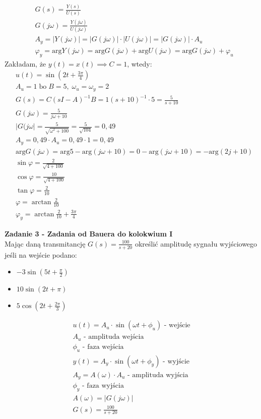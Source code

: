 \documentclass[a4paper,11pt]{article}
\begin{document}
\begin{align*}
&G(s)=\frac{Y(s)}{U(s)} \\
&G(j \omega)=\frac{Y(j\omega)}{U(j\omega)} \\
&A_y=|Y(j\omega)|=|G(j\omega)|\cdot |U(j\omega)|=|G(j\omega)|\cdot A_u \\
&\varphi _{y} = \text{arg} Y(j \omega) = \text{arg} G(j \omega) + \text{arg} U(j \omega )= \text{arg} G(j \omega) + \varphi _u
\end{align*}
Zakładam, że \( y(t) = x(t) \implies C = 1 \), wtedy:
\begin{align*}
&u(t)=\sin (2t+\frac{3\pi}{4} )\\
&A_{u}=1 \; \text{bo} \; B=5, \; \omega _{u} = \omega _y = 2 \\
&G(s)=C(sI-A)^{-1}B=1(s+10)^{-1}\cdot 5=\frac{5}{s+10} \\
&G(j \omega)=\frac{5}{j\omega + 10} \\
&|G(j\omega|=\frac{5}{\sqrt{\omega ^{2}+100}}=\frac{5}{\sqrt{104}}=0,49 \\
&A_y=0,49\cdot A_u = 0,49 \cdot 1 = 0,49\\
&\text{arg} G(j \omega)=\text{arg}5-\text{arg}(j\omega+10)= 0 - \text{arg}(j\omega +10)=-\text{arg}(2j+10) \\
& \sin \varphi = \frac{2}{\sqrt{4+100}} \\
& \cos \varphi = \frac{10}{\sqrt{4+100}} \\
& \tan \varphi = \frac{2}{10} \\
& \varphi = \arctan \frac{2}{10} \\
&\varphi _y = \arctan \frac{2}{10}+\frac{3\pi}{4}
\end{align*}

\newpage
\begin{framed}
\textbf{Zadanie 3 - Zadania od Bauera do kolokwium I } \\ 
Mając daną transmitancję \( G(s) = \frac{100}{s+20} \) określić amplitudę sygnału wyjściowego jeśli na wejście podano:
\begin{itemize}
\item \( -3 \sin (5t+\frac{\pi}{2}) \)
\item \( 10 \sin (2t+\pi) \)
\item \( 5 \cos (2t+\frac{2\pi}{3}) \)
\end{itemize}
\end{framed}
\begin{gather*}
u(t) = A_u \cdot \sin{(\omega t+\phi_u)}\text{ - wejście} \\
A_u \text{ - amplituda wejścia} \\
\phi_u \text{ - faza wejścia} \\
y(t) = A_y \cdot \sin{(\omega t+\phi_y)}\text{ - wyjście} \\
A_y = A(\omega) \cdot A_u \text{ - amplituda wyjścia} \\
\phi_y \text{ - faza wyjścia} \\
A(\omega) = |G(j\omega)| \\
G(s) = \frac{100}{s+20}
\end{gather*}
\end{document}
